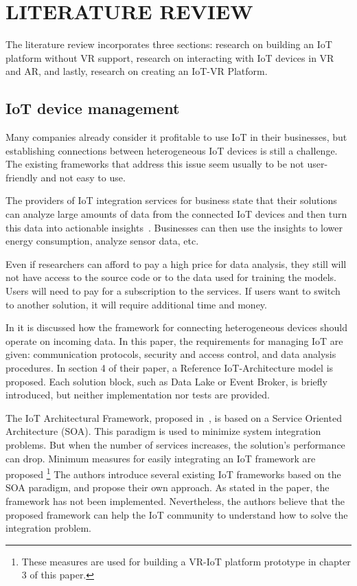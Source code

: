 

\chapter{\MakeUppercase{Literature review}}

The literature review incorporates three sections: research on building an IoT platform without VR support, research on interacting with IoT devices in VR and AR, and lastly, research on creating an IoT-VR Platform.

\section{IoT device management}

Many companies already consider it profitable to use IoT in their businesses, but establishing connections between heterogeneous IoT devices is still a challenge. The existing frameworks that address this issue seem usually to be not user-friendly and not easy to use. 

The providers of IoT integration services for business state that their solutions can analyze large amounts of data from the connected IoT devices and then turn this data into actionable insights~\cite{software_ag_software_2020}. Businesses can then use the insights to lower energy consumption, analyze sensor data, etc.

Even if researchers can afford to pay a high price for data analysis, they still will not have access to the source code or to the data used for training the models. Users will need to pay for a subscription to the services. If users want to switch to another solution, it will require additional time and money.

In \cite{k_mohapatra_solution_2016} it is discussed how the framework for connecting heterogeneous devices should operate on incoming data. In this paper, the requirements for managing IoT are given: communication protocols, security and access control, and data analysis procedures. In section 4 of their paper, a Reference IoT-Architecture model is proposed. Each solution block, such as Data Lake or Event Broker, is briefly introduced, but neither implementation nor tests are provided.

The IoT Architectural Framework, proposed in~\cite{uviase_iot_2018}, is based on a Service Oriented Architecture (SOA). This paradigm is used to minimize system integration problems. But when the number of services increases, the solution's performance can drop. Minimum measures for easily integrating an IoT framework are proposed \footnote{These measures are used for building a VR-IoT platform prototype in chapter 3 of this paper.} The authors introduce several existing IoT frameworks based on the SOA paradigm, and propose their own approach. As stated in the paper, the framework has not been implemented.  Nevertheless, the authors believe that the proposed framework can help the IoT community to understand how to solve the integration problem.

